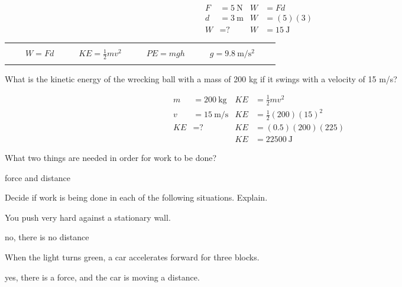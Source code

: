 \documentclass[10pt]{exam}
\newcommand{\printeqs}{
  \ifprintanswers
  \else
    \begin{center}
      \begin{tabular}{|*9c*5c|}
        \hline 
        &&&&&&&&&&&&&\\
        && 
        $W=Fd$                 & & & 
        $KE = \frac{1}{2}mv^2$ & & & 
        $PE=mgh$               & & & 
        $g=\SI{9.8}{\meter\per\second^2}$
        &&\\
        &&&&&&&&&&&&&\\
        \hline 
      \end{tabular}
    \end{center}
  \fi
}
\newenvironment{EnvKU}{
  \ifprintanswers
  \else
    \ku
  \fi
  \begin{solution}
}{
  \end{solution}
}
\begin{document}
\begin{questions}
  \begin{EnvKU}
    \begin{align*}
      F &= \SI{5}{\newton} & W &= Fd \\
      d &= \SI{3}{\meter}  & W &=(5)(3) \\
      W &= \text{?}            & W &= \SI{15}{\joule}
    \end{align*}
  \end{EnvKU}

\pagebreak

\printeqs

\question
  What is the kinetic energy of the wrecking ball with a mass of 200 kg if it swings with a velocity of 15 m/s?

  \begin{EnvKU}
    \begin{align*}
      m  &= \SI{200}{\kilo\gram}
                          & KE &= \frac{1}{2}mv^2 \\
      v  &= \SI{15}{\meter\per\second}    
                          & KE &= \frac{1}{2}(200)(15)^2 \\
      KE &= \text{?}
                          & KE &= (0.5)(200)(225) \\
         &                & KE &= \SI{22500}{\joule}
    \end{align*}
  \end{EnvKU}

\question
  What two things are needed in order for work to be done?

  \begin{solution}[\stretch{1}]
    force and distance
  \end{solution}

\question
  Decide if work is being done in each of the following situations.  Explain.

  \begin{parts}
    \item 
      You push very hard against a stationary wall.
    
      \begin{solution}[3em]
        no, there is no distance
      \end{solution}

    \item 
      When the light turns green, a car accelerates forward for three blocks.
    
      \begin{solution}[3em]
        yes, there is a force, and the car is moving a distance.
      \end{solution}


\end{parts}
\end{questions}
\end{document}
